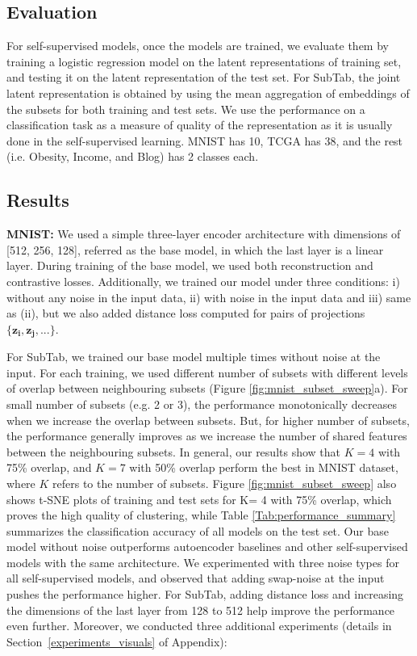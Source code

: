 \subsection{Evaluation}
For self-supervised models, once the models are trained, we evaluate them by training a logistic regression model on the latent representations of training set, and testing it on the latent representation of the test set. For SubTab, the joint latent representation is obtained by using the mean aggregation of embeddings of the subsets for both training and test sets. We use the performance on a classification task as a measure of quality of the representation as it is usually done in the self-supervised learning. MNIST has 10, TCGA has 38, and the rest (i.e. Obesity, Income, and Blog) has 2 classes each.

\subsection{Results}

\textbf{MNIST:}
We used a simple three-layer encoder architecture with dimensions of [512, 256, 128], referred as the base model, in which the last layer is a linear layer. During training of the base model, we used both reconstruction and contrastive losses. Additionally, we trained our model under three conditions: i) without any noise in the input data, ii) with noise in the input data and iii) same as (ii), but we also added distance loss computed for pairs of projections $\{\bm{z_i}, \bm{z_j},...\}$. 

For SubTab, we trained our base model multiple times without noise at the input. For each training, we used different number of subsets with different levels of overlap between neighbouring subsets (Figure \ref{fig:mnist_subset_sweep}a). For small number of subsets (e.g. 2 or 3), the performance monotonically decreases when we increase the overlap between subsets. But, for higher number of subsets, the performance generally improves as we increase the number of shared features between the neighbouring subsets. In general, our results show that $K=4$ with 75\% overlap, and $K=7$ with 50\% overlap perform the best in MNIST dataset, where $K$ refers to the number of subsets. Figure \ref{fig:mnist_subset_sweep} also shows t-SNE plots of training and test sets for K= 4 with 75\% overlap, which proves the high quality of clustering, while Table \ref{Tab:performance_summary} summarizes the classification accuracy of all models on the test set. Our base model without noise outperforms autoencoder baselines and other self-supervised models with the same architecture. We experimented with three noise types for all self-supervised models, and observed that adding swap-noise at the input pushes the performance higher. For SubTab, adding distance loss and increasing the dimensions of the last layer from 128 to 512 help improve the performance even further. Moreover, we conducted three additional experiments (details in Section~\ref{experiments_visuals} of Appendix):

